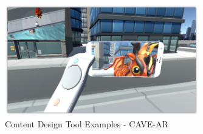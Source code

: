 \begin{figure}[h]
    \centering
    \includegraphics[width=0.75\textwidth]{Figures/Background/tools/cavallo.png}
    \caption{Content Design Tool Examples - CAVE-AR}
    \label{fig:cavallo}
\end{figure}


